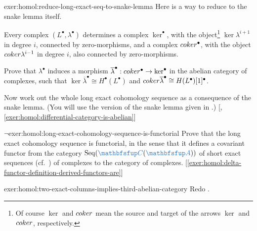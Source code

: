 \begin{exer}{\exerused{}}{exer:homol:reduce-long-exact-seq-to-snake-lemma}
  Here is a way to reduce
   to the
  snake lemma itself.

  Every complex $(L^\bullet, \lambda^\bullet)$ determines a complex
  $\ker^\bullet$, with the object\footnote{Of course $\ker$ and
    $coker$ mean the source and target of the arrows $\ker$ and
    $coker$, respectively.}  $\ker\lambda^{i+1}$ in degree $i$,
  connected by zero-morphisms, and a complex $coker^\bullet$, with
  the object $coker\lambda^{i-1}$ in degree $i$, also connected by
  zero-morphisms.

  Prove that $\lambda^\bullet$ induces a morphism
  $\overline{\lambda}^\bullet : coker^\bullet \to \ker^\bullet$ in
  the abelian category of complexes, such that
  $\ker\overline{\lambda}^\bullet \cong H^\bullet(L^\bullet)$ and
  $coker\overline{\lambda}^\bullet \cong H(L^\bullet)[1]^\bullet$.

  Now work out the whole long exact cohomology sequence as a
  consequence of the snake lemma. (You will use the version of the
  snake lemma given in
  .)
  [,
  \ref{exer:homol:differential-category-is-abelian}]
\end{exer}
\begin{exer}{$\lnot$}{exer:homol:long-exact-cohomology-sequence-is-functorial}
  Prove that the long exact cohomology sequence is functorial, in the
  sense that it defines a covariant functor from the category
  $\operatorname{Seq}(\categ{C}(\categ{A}))$ of short exact sequences
  (cf.\
  ) of
  complexes to the category of
  complexes. [\ref{exer:homol:delta-functor-definition-derived-functors-are}]
\end{exer}
\begin{exer}{}{exer:homol:two-exact-columns-implies-third-abelian-category}
  Redo
  .
\end{exer}

